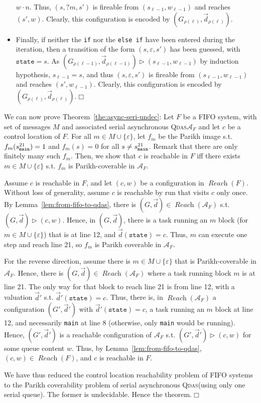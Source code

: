 \documentclass[runningheads,oribibl,]{article}
\newcommand{\Aa}{\ensuremath{\mathcal{A}}\xspace}
\newcommand{\e}{\ensuremath{\varepsilon}\xspace}
\newcommand{\qdas}{\textsc{Qdas}\xspace}
\DeclareMathOperator{\Reach}{\textit{Reach}}
\newcommand{\Graph}{\ensuremath{G}}
\newcommand{\Data}{\ensuremath{\vec{d}}}
\newcommand{\mystate}[2]{\ensuremath{s^{#1}_{\mathtt{#2}}}}
\newenvironment{proof}{\noindent{\it Proof.\hspace*{.5cm}}}{}
\newcommand{\qed}{\hfill$\Box$}
\begin{document}
\begin{proof}
\begin{itemize}
    $w\cdot n$. Thus, $(s,?m,s')$ is fireable from $(s_{\ell-1},
    w_{\ell-1})$ and reaches $(s',w)$. Clearly, this configuration is
    encoded by $(\Graph_{\rho(\ell)},\Data_{\rho(\ell)})$.
  \item Finally, if neither the \texttt{if} nor the \texttt{else if}
    have been entered during the iteration, then a transition of the
    form $(s,\e,s')$ has been guessed, with $\texttt{state}=s$. As
    $(\Graph_{\rho(\ell-1)},\Data_{\rho(\ell-1)})\rhd (s_{\ell-1},
    w_{\ell-1})$ by induction hypothesis, $s_{\ell-1}=s$, and thus
    $(s,\e,s')$ is fireable from $(s_{\ell-1}, w_{\ell-1})$ and reaches
    $(s',w_{\ell-1})$. Clearly, this configuration is encoded by
    $(\Graph_{\rho(\ell)},\Data_{\rho(\ell)})$.\qed
  \end{itemize}
\end{proof}



We can now prove Theorem~\ref{the:async-seri-undec}:
\begin{proof}
  Let $F$ be a FIFO system, with set of messages $M$ and associated
  serial asynchronous \qdas $\Aa_F$ and let $c$ be a control location
  of $F$. For all $m\in M\cup\{\e\}$, let $f_m$ be the Parikh image
  s.t. $f_m(\mystate{21}{{\tt main}})=1$ and $f_m(s)=0$ for all $s\neq
  \mystate{21}{{\tt main}}$. Remark that there are only finitely many
  such $f_m$. Then, we show that $c$ is reachable in $F$ iff there
  exists $m\in M\cup\{\e\}$ s.t.  $f_m$ is Parikh-coverable in
  $\Aa_F$.

  Assume $c$ is reachable in $F$, and let $(c,w)$ be a configuration
  in $\Reach(F)$. Without loss of generality, assume $c$ is reachable
  by run that visits $c$ only once. By
  Lemma~\ref{lem:from-fifo-to-qdas}, there is
  $(\Graph,\Data)\in\Reach(\Aa_F)$
  s.t. $(\Graph,\Data)\rhd(c,w)$. Hence, in $(\Graph,\Data)$, there is
  a task running an $m$ block (for $m\in M\cup\{\e\}$) that is at line
  12, and $\Data(\mathtt{state})=c$. Thus, $m$ can execute one step
  and reach line 21, so $f_m$ is Parikh coverable in $\Aa_F$.

  For the reverse direction, assume there is $m\in M\cup\{\e\}$ that
  is Parikh-coverable in $\Aa_F$. Hence, there is
  $(\Graph,\Data)\in\Reach(\Aa_F)$ where a task running block $m$ is
  at line 21. The only way for that block to reach line 21 is from
  line 12, with a valuation $\Data'$
  s.t. $\Data'(\mathtt{state})=c$. Thus, there is, in $\Reach(\Aa_F)$
  a configuration $(\Graph',\Data')$ with $\Data'(\mathtt{state})=c$,
  a task running an $m$ block at line 12, and necessarily
  \texttt{main} at line 8 (otherwise, only \texttt{main} would be
  running). Hence, $(\Graph',\Data')$ is a reachable configuration of
  $\Aa_F$ s.t. $(\Graph',\Data')\rhd (c,w)$ for some queue content
  $w$. Thus, by Lemma~\ref{lem:from-fifo-to-qdas},
  $(c,w)\in\Reach(F)$, and $c$ is reachable in $F$.

  We have thus reduced the control location reachability problem of
  FIFO systems to the Parikh coverability problem of serial
  asynchronous \qdas (using only one serial queue). The former is
  undecidable. Hence the theorem.\qed
\end{proof}
\end{document}
